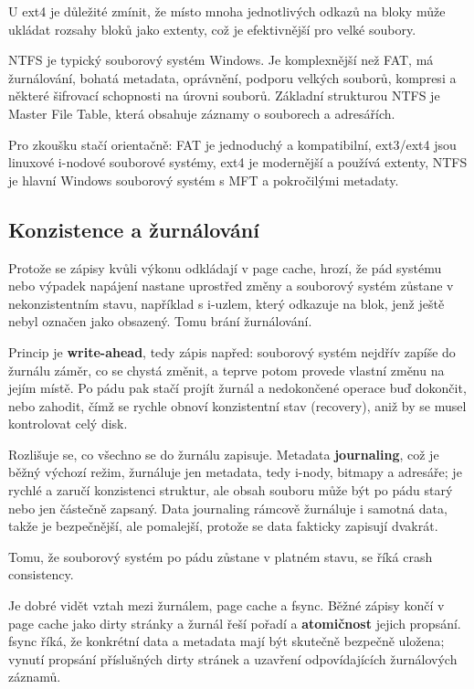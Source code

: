 U ext4 je důležité zmínit, že místo mnoha jednotlivých odkazů na bloky může ukládat rozsahy bloků jako extenty, což je efektivnější pro velké soubory.

NTFS je typický souborový systém Windows. Je komplexnější než FAT, má žurnálování, bohatá metadata, oprávnění, podporu velkých souborů, kompresi a některé šifrovací schopnosti na úrovni souborů. Základní strukturou NTFS je Master File Table, která obsahuje záznamy o souborech a adresářích.

Pro zkoušku stačí orientačně: FAT je jednoduchý a kompatibilní, ext3/ext4 jsou linuxové i-nodové souborové systémy, ext4 je modernější a používá extenty, NTFS je hlavní Windows souborový systém s MFT a pokročilými metadaty.

\subsection*{Konzistence a žurnálování}

Protože se zápisy kvůli výkonu odkládají v page cache, hrozí, že pád systému nebo výpadek napájení nastane uprostřed změny a souborový systém zůstane v nekonzistentním stavu, například s i-uzlem, který odkazuje na blok, jenž ještě nebyl označen jako obsazený. Tomu brání žurnálování.

Princip je \textbf{write-ahead}, tedy zápis napřed: souborový systém nejdřív zapíše do žurnálu záměr, co se chystá změnit, a teprve potom provede vlastní změnu na jejím místě. Po pádu pak stačí projít žurnál a nedokončené operace buď dokončit, nebo zahodit, čímž se rychle obnoví konzistentní stav (recovery), aniž by se musel kontrolovat celý disk.

Rozlišuje se, co všechno se do žurnálu zapisuje. Metadata \textbf{journaling}, což je běžný výchozí režim, žurnáluje jen metadata, tedy i-nody, bitmapy a adresáře; je rychlé a zaručí konzistenci struktur, ale obsah souboru může být po pádu starý nebo jen částečně zapsaný. Data journaling rámcově žurnáluje i samotná data, takže je bezpečnější, ale pomalejší, protože se data fakticky zapisují dvakrát.

Tomu, že souborový systém po pádu zůstane v platném stavu, se říká crash consistency.

Je dobré vidět vztah mezi žurnálem, page cache a fsync. Běžné zápisy končí v page cache jako dirty stránky a žurnál řeší pořadí a \textbf{atomičnost} jejich propsání. fsync říká, že konkrétní data a metadata mají být skutečně bezpečně uložena; vynutí propsání příslušných dirty stránek a uzavření odpovídajících žurnálových záznamů.

